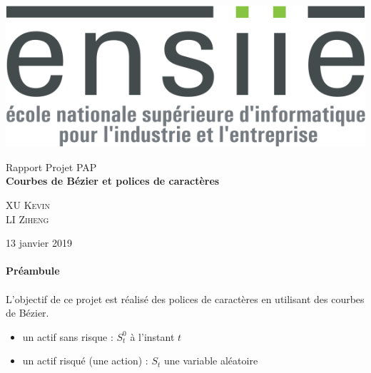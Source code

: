 \documentclass[a4paper, 12pt]{article}
\begin{document}
\begin{titlepage}
			\includegraphics[scale=0.25]{Images/Logo_transparent.png} 
			\begin{center}
				\vspace*{6cm}
				{ \huge Rapport Projet PAP \\ \vspace*{2cm}
				\textbf{Courbes de Bézier et polices de caractères} \\
				}
			\vspace*{2cm}
				\begin{center} \large
					\textsc{XU} \textsc{Kevin}\\
					\textsc{LI} \textsc{Ziheng}
				\end{center}
				\begin{minipage}{0.4\textwidth}
				\end{minipage}
				{\large 13 janvier 2019}
			\end{center}
	\end{titlepage}
	
	\renewcommand{\contentsname}{Sommaire} 
	{\setlength{\baselineskip}{1.2\baselineskip}
\tableofcontents\par} %
		
	\newpage
	\vspace*{3cm} 
	\paragraph{\Huge{Préambule}}

	\paragraph{}
	L'objectif de ce projet est réalisé des polices de caractères en utilisant des courbes de Bézier.\\
\begin{itemize}
\item un actif sans risque : $S_t^0$ à l'instant $t$  
\item un actif risqué (une action) : $S_t$ une variable aléatoire 
\end{itemize}
	
\end{document}
